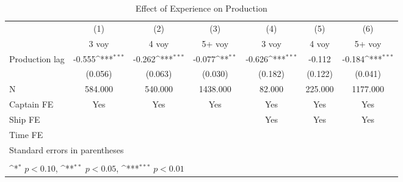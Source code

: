 \begin{table}[htbp]\centering
\def\sym#1{\ifmmode^{#1}\else\(^{#1}\)\fi}
\caption{Effect of Experience on Production}
\begin{tabular}{l*{6}{c}}
\hline\hline
                    &\multicolumn{1}{c}{(1)}&\multicolumn{1}{c}{(2)}&\multicolumn{1}{c}{(3)}&\multicolumn{1}{c}{(4)}&\multicolumn{1}{c}{(5)}&\multicolumn{1}{c}{(6)}\\
                    &\multicolumn{1}{c}{3 voy}&\multicolumn{1}{c}{4 voy}&\multicolumn{1}{c}{5+  voy}&\multicolumn{1}{c}{3 voy}&\multicolumn{1}{c}{4 voy}&\multicolumn{1}{c}{5+  voy}\\
\hline
Production lag      &      -0.555\sym{***}&      -0.262\sym{***}&      -0.077\sym{**} &      -0.626\sym{***}&      -0.112         &      -0.184\sym{***}\\
                    &     (0.056)         &     (0.063)         &     (0.030)         &     (0.182)         &     (0.122)         &     (0.041)         \\
\hline
N                   &     584.000         &     540.000         &    1438.000         &      82.000         &     225.000         &    1177.000         \\
Captain FE          &         Yes         &         Yes         &         Yes         &         Yes         &         Yes         &         Yes         \\
Ship FE             &                     &                     &                     &         Yes         &         Yes         &         Yes         \\
Time FE             &                     &                     &                     &                     &                     &                     \\
\hline\hline
\multicolumn{7}{l}{\footnotesize Standard errors in parentheses}\\
\multicolumn{7}{l}{\footnotesize  }\\
\multicolumn{7}{l}{\footnotesize \sym{*} \(p<0.10\), \sym{**} \(p<0.05\), \sym{***} \(p<0.01\)}\\
\end{tabular}
\end{table}

